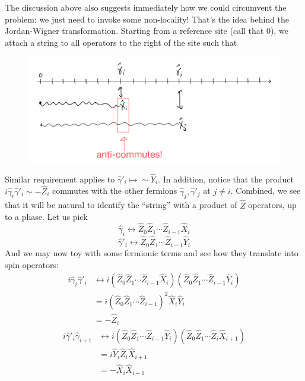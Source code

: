 The discussion above also suggests immediately how we could circumvent the problem: we just need to invoke some non-locality! That's the idea behind the Jordan-Wigner transformation. Starting from a reference site (call that 0), we attach a string to all operators to the right of the site such that
\begin{figure}[H]
    \centering
    \includegraphics[width=\textwidth]{jupyterbook/data/fig/lec26-fig01.png}
\end{figure}
Similar requirement applies to $\hat{\gamma}'_i\mapsto \sim \hat{Y}_i$. In addition, notice that the product $i\hat{\gamma}_i\hat{\gamma}'_i\sim -\hat{Z}_i$ commutes with the other fermions $\hat{\gamma}_j,\hat{\gamma}'_j$ at $j\ne i$. Combined, we see that it will be natural to identify the ``string'' with a product of $\hat{Z}$ operators, up to a phase. Let us pick
\[ \hat{\gamma}_i\leftrightarrow \hat{Z}_0\hat{Z}_1\cdots \hat{Z}_{i-1}\hat{X}_i\]
\[ \hat{\gamma}'_i\leftrightarrow \hat{Z}_0\hat{Z}_1\cdots \hat{Z}_{i-1}\hat{Y}_i\]
And we may now toy with some fermionic terms and see how they translate into spin operators:
\begin{align*}
    i\hat{\gamma}_i\hat{\gamma}'_i&\leftrightarrow i\left( \hat{Z}_0\hat{Z}_1\cdots \hat{Z}_{i-1}\hat{X}_i \right) \left( \hat{Z}_0\hat{Z}_1\cdots \hat{Z}_{i-1}\hat{Y}_i \right) \\
    &=i\left( \hat{Z}_0\hat{Z}_1\cdots \hat{Z}_{i-1} \right) ^2\hat{X}_i\hat{Y}_i\\
    &=-\hat{Z}_i
\end{align*}
\begin{align*}
    i\hat{\gamma}'_i\hat{\gamma}_{i+1}&\leftrightarrow i\left( \hat{Z}_0\hat{Z}_1\cdots \hat{Z}_{i-1}\hat{Y}_i \right) \left( \hat{Z}_0\hat{Z}_1\cdots \hat{Z}_i\hat{X}_{i+1} \right) \\
    &=i\hat{Y}_i\hat{Z}_i\hat{X}_{i+1}\\
    &=-\hat{X}_i\hat{X}_{i+1}
\end{align*}
